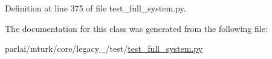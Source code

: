 Definition at line 375 of file test\+\_\+full\+\_\+system.\+py.



The documentation for this class was generated from the following file\+:\begin{DoxyCompactItemize}
\item 
parlai/mturk/core/legacy\+\_/test/\hyperlink{legacy__2018_2test_2test__full__system_8py}{test\+\_\+full\+\_\+system.\+py}\end{DoxyCompactItemize}
